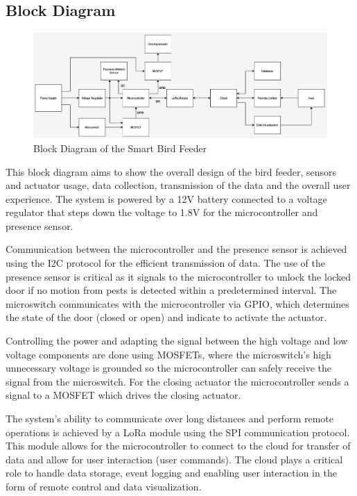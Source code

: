 \documentclass[12pt,a4paper]{article}
\begin{document}
\subsection{Block Diagram}
\begin{figure}[h]
    \centering
    \includegraphics[width=1\textwidth]{images/Block_Diagram.png}
    \caption{Block Diagram of the Smart Bird Feeder}
\end{figure}


This block diagram aims to show the overall design of the bird feeder, sensors and actuator usage, data collection, transmission of the data and the overall user experience. The system is powered by a 12V battery connected to a voltage regulator that steps down the voltage to 1.8V for the microcontroller and presence sensor.  

Communication between the microcontroller and the presence sensor is achieved using the I2C protocol for the efficient transmission of data. The use of the presence sensor is critical as it signals to the microcontroller to unlock the locked door if no motion from pests is detected within a predetermined interval. The microswitch communicates with the microcontroller via GPIO, which determines the state of the door (closed or open) and indicate to activate the actuator.  

Controlling the power and adapting the signal between the high voltage and low voltage components are done using MOSFETs, where the microswitch’s high unnecessary voltage is grounded so the microcontroller can safely receive the signal from the microswitch. For the closing actuator the microcontroller sends a signal to a MOSFET which drives the closing actuator. 

The system’s ability to communicate over long distances and perform remote operations is achieved by a LoRa module using the SPI communication protocol. This module allows for the microcontroller to connect to the cloud for transfer of data and allow for user interaction (user commands). The cloud plays a critical role to handle data storage, event logging and enabling user interaction in the form of remote control and data visualization. 
\end{document}
